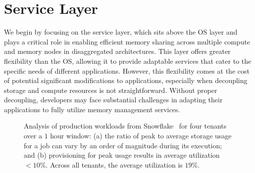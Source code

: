 \chapter{Service Layer}
\label{chap:service}

We begin by focusing on the service layer, which sits above the OS layer and plays a critical role in enabling efficient memory sharing across multiple compute and memory nodes in disaggregated architectures. This layer offers greater flexibility than the OS, allowing it to provide adaptable services that cater to the specific needs of different applications. However, this flexibility comes at the cost of potential significant modifications to applications, especially when decoupling storage and compute resources is not straightforward. Without proper decoupling, developers may face substantial challenges in adapting their applications to fully utilize memory management services.

\begin{figure}[t]
  \centering
  \caption[Snowflake workload anaylsis.]{\small{Analysis of production workloads from Snowflake~\cite{snowset} for four tenants over a $1$ hour window: (a) the ratio of peak to average storage usage for a job can vary by an order of magnitude during its execution; and (b) provisioning for peak usage results in average utilization $<10\%$. Across all tenants, the average utilization is $19\%$.}}\label{fig:ephemerals}%
\end{figure}


